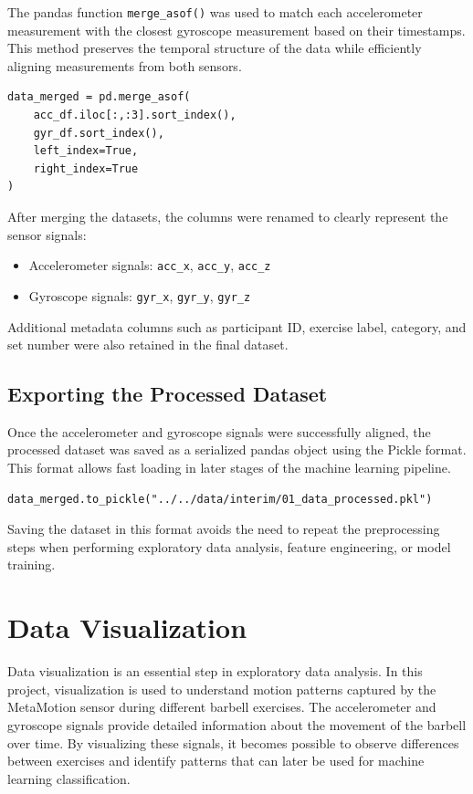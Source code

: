 \documentclass[12pt,a4paper]{article}
\begin{document}
The pandas function \texttt{merge\_asof()} was used to match each accelerometer measurement with the closest gyroscope measurement based on their timestamps. This method preserves the temporal structure of the data while efficiently aligning measurements from both sensors.

\begin{lstlisting}
data_merged = pd.merge_asof(
    acc_df.iloc[:,:3].sort_index(),
    gyr_df.sort_index(),
    left_index=True,
    right_index=True
)
\end{lstlisting}

After merging the datasets, the columns were renamed to clearly represent the sensor signals:

\begin{itemize}
\item Accelerometer signals: \texttt{acc\_x}, \texttt{acc\_y}, \texttt{acc\_z}
\item Gyroscope signals: \texttt{gyr\_x}, \texttt{gyr\_y}, \texttt{gyr\_z}
\end{itemize}

Additional metadata columns such as participant ID, exercise label, category, and set number were also retained in the final dataset.

\subsection{Exporting the Processed Dataset}

Once the accelerometer and gyroscope signals were successfully aligned, the processed dataset was saved as a serialized pandas object using the Pickle format. This format allows fast loading in later stages of the machine learning pipeline.

\begin{lstlisting}
data_merged.to_pickle("../../data/interim/01_data_processed.pkl")
\end{lstlisting}

Saving the dataset in this format avoids the need to repeat the preprocessing steps when performing exploratory data analysis, feature engineering, or model training.
\section{Data Visualization}

Data visualization is an essential step in exploratory data analysis. In this project, visualization is used to understand motion patterns captured by the MetaMotion sensor during different barbell exercises. The accelerometer and gyroscope signals provide detailed information about the movement of the barbell over time. By visualizing these signals, it becomes possible to observe differences between exercises and identify patterns that can later be used for machine learning classification.
\end{document}

